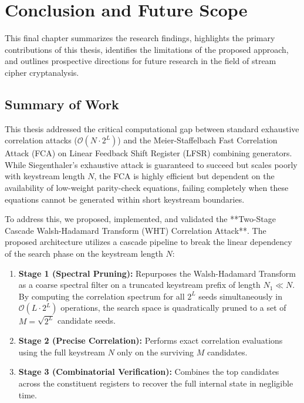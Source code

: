 \chapter{Conclusion and Future Scope}
\label{ch:conclusion}

This final chapter summarizes the research findings, highlights the primary contributions of this thesis, identifies the limitations of the proposed approach, and outlines prospective directions for future research in the field of stream cipher cryptanalysis.

\section{Summary of Work}
\label{sec:summary_of_work}

This thesis addressed the critical computational gap between standard exhaustive correlation attacks ($\mathcal{O}(N \cdot 2^L)$) and the Meier-Staffelbach Fast Correlation Attack (FCA) on Linear Feedback Shift Register (LFSR) combining generators. While Siegenthaler's exhaustive attack is guaranteed to succeed but scales poorly with keystream length $N$, the FCA is highly efficient but dependent on the availability of low-weight parity-check equations, failing completely when these equations cannot be generated within short keystream boundaries.

To address this, we proposed, implemented, and validated the **Two-Stage Cascade Walsh-Hadamard Transform (WHT) Correlation Attack**. The proposed architecture utilizes a cascade pipeline to break the linear dependency of the search phase on the keystream length $N$:
\begin{enumerate}
    \item \textbf{Stage 1 (Spectral Pruning):} Repurposes the Walsh-Hadamard Transform as a coarse spectral filter on a truncated keystream prefix of length $N_1 \ll N$. By computing the correlation spectrum for all $2^L$ seeds simultaneously in $\mathcal{O}(L \cdot 2^L)$ operations, the search space is quadratically pruned to a set of $M = \sqrt{2^L}$ candidate seeds.
    \item \textbf{Stage 2 (Precise Correlation):} Performs exact correlation evaluations using the full keystream $N$ only on the surviving $M$ candidates.
    \item \textbf{Stage 3 (Combinatorial Verification):} Combines the top candidates across the constituent registers to recover the full internal state in negligible time.
\end{enumerate}


